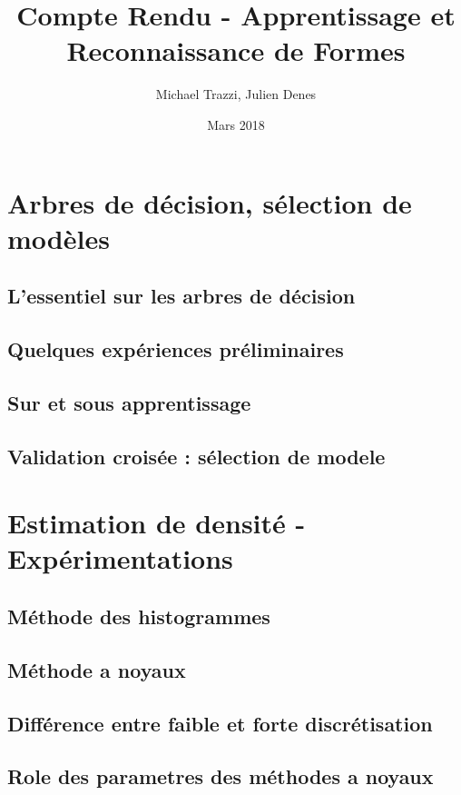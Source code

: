 \documentclass{article}
\title{Compte Rendu - Apprentissage et Reconnaissance de Formes}
\author{Michael Trazzi, Julien Denes }
\date{Mars 2018}
\begin{document}
\maketitle

\section{Arbres de décision, sélection de modèles}

\subsection*{L'essentiel sur les arbres de décision}

\subsection*{Quelques expériences préliminaires}

\subsection*{Sur et sous apprentissage}

\subsection*{Validation croisée : sélection de modele}

\section{Estimation de densité - Expérimentations}

\subsection*{Méthode des histogrammes}

\subsection*{Méthode a noyaux}

\subsection*{Différence entre faible et forte discrétisation}

\subsection*{Role des parametres des méthodes a noyaux}
\end{document}

